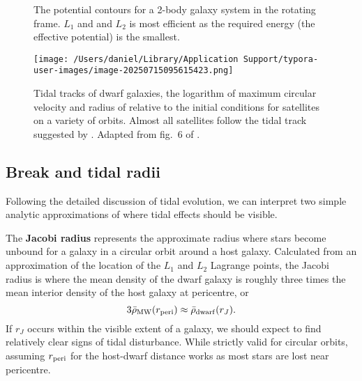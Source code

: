 \begin{figure}
\centering
{}
\caption[Lagrange points]{The potential contours for a 2-body galaxy
system in the rotating frame. \(L_1\) and and \(L_2\) is most efficient
as the required energy (the effective potential) is the
smallest.}\label{fig:lagrange_points}
\end{figure}

\begin{figure}
\centering
\texttt{[image: /Users/daniel/Library/Application Support/typora-user-images/image-20250715095615423.png]}
\caption[Tidal tracks of dwarf galaxies]{Tidal tracks of dwarf galaxies,
the logarithm of maximum circular velocity and radius of relative to the
initial conditions for satellites on a variety of orbits. Almost all
satellites follow the tidal track suggested by \citet{EN2021}. Adapted
from fig.~6 of \citet{EN2021}.}\label{fig:tidal_tracks}
\end{figure}

\subsection{Break and tidal radii}\label{sec:break_radii}

Following the detailed discussion of tidal evolution, we can interpret
two simple analytic approximations of where tidal effects should be
visible.

The \textbf{Jacobi radius} represents the approximate radius where stars
become unbound for a galaxy in a circular orbit around a host galaxy.
Calculated from an approximation of the location of the \(L_1\) and
\(L_2\) Lagrange points, the Jacobi radius is where the mean density of
the dwarf galaxy is roughly three times the mean interior density of the
host galaxy at pericentre, or \begin{equation}{
3\bar \rho_{\rm MW}(r_{\rm peri}) \approx \bar \rho_{\rm dwarf}(r_J).
}\end{equation} If \(r_J\) occurs within the visible extent of a galaxy,
we should expect to find relatively clear signs of tidal disturbance.
While strictly valid for circular orbits, assuming \(r_{\rm peri}\) for
the host-dwarf distance works as most stars are lost near pericentre.


